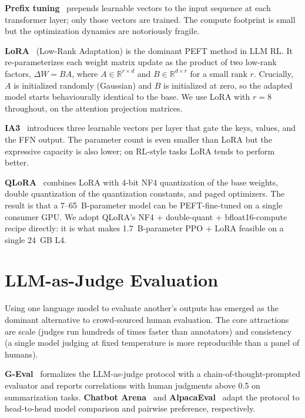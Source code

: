 \documentclass[12pt,a4paper]{report}
\begin{document}
\textbf{Prefix tuning}~\cite{li2021prefix} prepends learnable vectors to the input sequence at each transformer layer; only those vectors are trained. The compute footprint is small but the optimization dynamics are notoriously fragile.

\textbf{LoRA}~\cite{hu2021lora} (Low-Rank Adaptation) is the dominant PEFT method in LLM RL. It re-parameterizes each weight matrix update as the product of two low-rank factors, $\Delta W = BA$, where $A \in \mathbb{R}^{r \times d}$ and $B \in \mathbb{R}^{d \times r}$ for a small rank $r$. Crucially, $A$ is initialized randomly (Gaussian) and $B$ is initialized at zero, so the adapted model starts behaviourally identical to the base. We use LoRA with $r=8$ throughout, on the attention projection matrices.

\textbf{IA3}~\cite{liu2022ia3} introduces three learnable vectors per layer that gate the keys, values, and the FFN output. The parameter count is even smaller than LoRA but the expressive capacity is also lower; on RL-style tasks LoRA tends to perform better.

\textbf{QLoRA}~\cite{dettmers2023qlora} combines LoRA with 4-bit NF4 quantization of the base weights, double quantization of the quantization constants, and paged optimizers. The result is that a 7--65~B-parameter model can be PEFT-fine-tuned on a single consumer GPU. We adopt QLoRA's NF4 + double-quant + bfloat16-compute recipe directly: it is what makes 1.7~B-parameter PPO + LoRA feasible on a single 24~GB L4.

\section{LLM-as-Judge Evaluation}\label{sec:lit-judge}

Using one language model to evaluate another's outputs has emerged as the dominant alternative to crowd-sourced human evaluation. The core attractions are scale (judges run hundreds of times faster than annotators) and consistency (a single model judging at fixed temperature is more reproducible than a panel of humans).

\textbf{G-Eval}~\cite{liu2023geval} formalizes the LLM-as-judge protocol with a chain-of-thought-prompted evaluator and reports correlations with human judgments above 0.5 on summarization tasks. \textbf{Chatbot Arena}~\cite{zheng2023chatbot} and \textbf{AlpacaEval}~\cite{li2023alpacaeval} adapt the protocol to head-to-head model comparison and pairwise preference, respectively.
\end{document}
